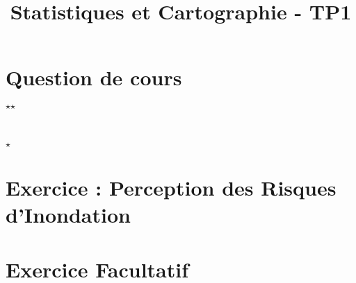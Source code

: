 





\title{\textbf{Statistiques et Cartographie - TP1}}

\date{}


\maketitle

\justify

\thispagestyle{firststyle}


\section{Question de cours}

\textit{}


\bigskip
\bigskip

\strut\hfill$\star$\hspace{1.2cm}$\star$\hfill\strut\vspace{0.1cm}\\

\strut\hfill$\star$\hfill\strut\par



\section{Exercice : Perception des Risques d'Inondation}

\textit{}






\section*{Exercice Facultatif}











